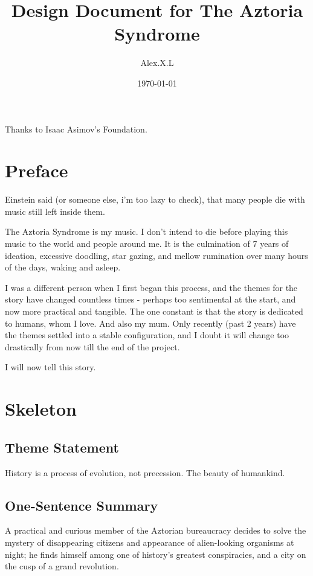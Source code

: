 \documentclass[11pt]{article}
\begin{document}
\begin{titlepage}
\title{Design Document for The Aztoria Syndrome}
\author{Alex.X.L}
\date{\today} %
\maketitle
\thispagestyle{empty} %
\end{titlepage}

Thanks to Isaac Asimov's Foundation.

\tableofcontents
\newpage %






\section{Preface}
Einstein said (or someone else, i'm too lazy to check), that many people die with music still left inside them.

The Aztoria Syndrome is my music. 
I don't intend to die before playing this music to the world and people around me. 
It is the culmination of 7 years of ideation, excessive doodling, star gazing, and mellow rumination over many hours of the days, waking and asleep.

I was a different person when I first began this process, and the themes for the story have changed countless times - perhaps too sentimental at the start, and now more practical and tangible.
The one constant is that the story is dedicated to humans, whom I love. 
And also my mum. 
Only recently (past 2 years) have the themes settled into a stable configuration, and I doubt it will change too drastically from now till the end of the project.

I will now tell this story.
\newpage




\section{Skeleton}
	\subsection{Theme Statement}
	History is a process of evolution, not precession.
	The beauty of humankind.
	\subsection{One-Sentence Summary}
	A practical and curious member of the Aztorian bureaucracy decides to solve the mystery of disappearing citizens and appearance of alien-looking organisms at night; he finds himself among one of history's greatest conspiracies, and a city on the cusp of a grand revolution.
\end{document}
